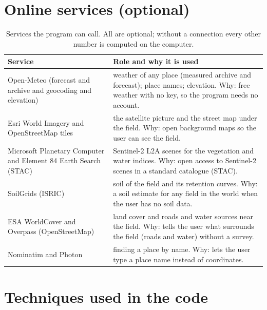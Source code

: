 \section{Online services (optional)}
\begin{table}[H]\centering\small
\caption{Services the program can call. All are optional; without a connection every other number is computed on the computer.}\label{tab:svc}
\begin{tabular}{@{}>{\raggedright\arraybackslash}p{4.1cm}>{\raggedright\arraybackslash}p{9.0cm}@{}}
\toprule Service & Role and why it is used\\\midrule
Open-Meteo (forecast and archive and geocoding and elevation) & weather of any place (measured archive and forecast); place names; elevation. Why: free weather with no key, so the program needs no account.\\
Esri World Imagery and OpenStreetMap tiles & the satellite picture and the street map under the field. Why: open background maps so the user can see the field.\\
Microsoft Planetary Computer and Element 84 Earth Search (STAC) & Sentinel-2 L2A scenes for the vegetation and water indices. Why: open access to Sentinel-2 scenes in a standard catalogue (STAC).\\
SoilGrids (ISRIC) & soil of the field and its retention curves. Why: a soil estimate for any field in the world when the user has no soil data.\\
ESA WorldCover and Overpass (OpenStreetMap) & land cover and roads and water sources near the field. Why: tells the user what surrounds the field (roads and water) without a survey.\\
Nominatim and Photon & finding a place by name. Why: lets the user type a place name instead of coordinates.\\
\bottomrule\end{tabular}\end{table}

\section{Techniques used in the code}
